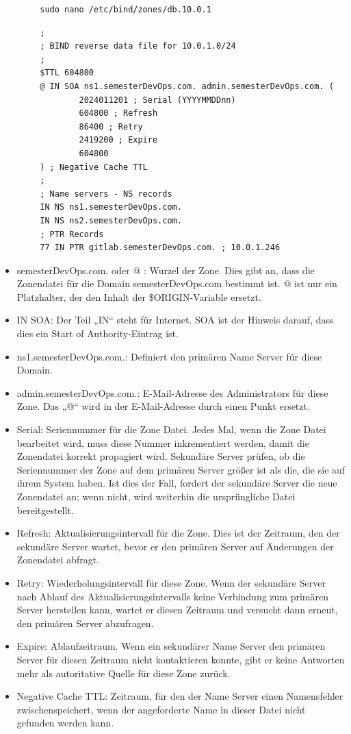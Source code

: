 \documentclass[a4paper,12pt]{article}
\begin{document}
\begin{verbatim}
		sudo nano /etc/bind/zones/db.10.0.1
\end{verbatim}
\begin{verbatim}
		;
		; BIND reverse data file for 10.0.1.0/24
		;
		$TTL 604800
		@ IN SOA ns1.semesterDevOps.com. admin.semesterDevOps.com. (
				2024011201 ; Serial (YYYYMMDDnn)
				604800 ; Refresh
				86400 ; Retry
				2419200 ; Expire
				604800 
		) ; Negative Cache TTL
		;
		; Name servers - NS records
		IN NS ns1.semesterDevOps.com.
		IN NS ns2.semesterDevOps.com.
		; PTR Records
		77 IN PTR gitlab.semesterDevOps.com. ; 10.0.1.246
\end{verbatim}

\begin{itemize}
	\item semesterDevOps.com. oder @ : Wurzel der Zone. Dies gibt an, dass die Zonendatei für die Domain semesterDevOps.com bestimmt ist.
@ ist nur ein Platzhalter, der den Inhalt der \${}ORIGIN-Variable ersetzt.

\item IN SOA: Der Teil „IN“ steht für Internet. SOA ist der Hinweis darauf, dass dies ein Start of Authority-Eintrag ist.

\item ns1.semesterDevOps.com.: Definiert den primären Name Server für diese Domain.

\item admin.semesterDevOps.com.: E-Mail-Adresse des Administrators für diese Zone. Das „@“ wird in der E-Mail-Adresse durch einen Punkt ersetzt.

\item Serial: Seriennummer für die Zone Datei. Jedes Mal, wenn die Zone Datei bearbeitet wird, muss diese Nummer inkrementiert werden, damit die Zonendatei korrekt propagiert wird.
Sekundäre Server prüfen, ob die Seriennummer der Zone auf dem primären Server größer ist als die, die sie auf ihrem System haben. Ist dies der Fall, fordert der sekundäre Server die neue Zonendatei an; wenn nicht, wird weiterhin die ursprüngliche Datei bereitgestellt.

\item Refresh: Aktualisierungsintervall für die Zone. Dies ist der Zeitraum, den der sekundäre Server wartet, bevor er den primären Server auf Änderungen der Zonendatei abfragt.

\item Retry: Wiederholungsintervall für diese Zone. Wenn der sekundäre Server nach Ablauf des Aktualisierungsintervalls keine Verbindung zum primären Server herstellen kann, wartet er diesen Zeitraum und versucht dann erneut, den primären Server abzufragen.

\item Expire: Ablaufzeitraum. Wenn ein sekundärer Name Server den primären Server für diesen Zeitraum nicht kontaktieren konnte, gibt er keine Antworten mehr als autoritative Quelle für diese Zone zurück.

\item Negative Cache TTL: Zeitraum, für den der Name Server einen Namensfehler zwischenspeichert, wenn der angeforderte Name in dieser Datei nicht gefunden werden kann.
\end{itemize}
\end{document}
